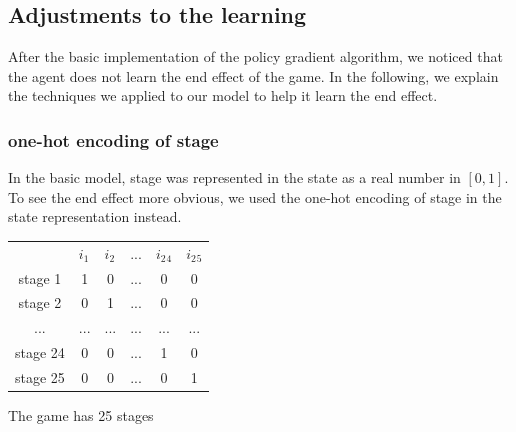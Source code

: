 \documentclass[a4paper,12pt]{article}  %
\theoremstyle{definition}
\begin{document}
\subsection{Adjustments to the learning}
	After the basic implementation of the policy gradient algorithm, we noticed that the agent does not learn the end effect of the game. In the following, we explain the techniques we applied to our model to help it learn the end effect.
	\subsubsection{one-hot encoding of stage}
	In the basic model, stage was represented in the state as a real number in $ [0,1] $. To see the end effect more obvious, we used the one-hot encoding of stage in the state representation instead. 
	
	\begin{table}[!h]
		\centering
		
		\begin{tabular}{p{}p{}p{}p{}p{}p{}}
			& $\displaystyle i_{1}$ & $\displaystyle i_{2}$ & ... & $\displaystyle i_{2}{}_{4}$ & $\displaystyle i_{2}{}_{5}$ \\
			\cline{2-6} 
			\multicolumn{1}{c|}{stage 1} & \multicolumn{1}{c|}{1} & \multicolumn{1}{c|}{0} & \multicolumn{1}{c|}{...} & \multicolumn{1}{c|}{0} & \multicolumn{1}{c|}{0} \\
			\cline{2-6} 
			\multicolumn{1}{c|}{stage 2} & \multicolumn{1}{c|}{0} & \multicolumn{1}{c|}{1} & \multicolumn{1}{c|}{...} & \multicolumn{1}{c|}{0} & \multicolumn{1}{c|}{0} \\
			\cline{2-6} 
			\multicolumn{1}{c|}{...} & \multicolumn{1}{c|}{...} & \multicolumn{1}{c|}{...} & \multicolumn{1}{c|}{...} & \multicolumn{1}{c|}{...} & \multicolumn{1}{c|}{...} \\
			\cline{2-6} 
			\multicolumn{1}{c|}{stage 24} & \multicolumn{1}{c|}{0} & \multicolumn{1}{c|}{0} & \multicolumn{1}{c|}{...} & \multicolumn{1}{c|}{1} & \multicolumn{1}{c|}{0} \\
			\cline{2-6} 
			\multicolumn{1}{c|}{stage 25} & \multicolumn{1}{c|}{0} & \multicolumn{1}{c|}{0} & \multicolumn{1}{c|}{...} & \multicolumn{1}{c|}{0} & \multicolumn{1}{c|}{1} \\
			\cline{2-6}
		\end{tabular}
		
	\end{table}
	The game has 25 stages
\end{document}
